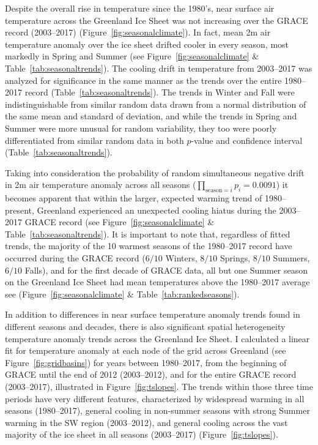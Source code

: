 \documentclass[11pt]{report}
\begin{document}
Despite the overall rise in temperature since the 1980's, near surface air temperature across the Greenland Ice Sheet was not increasing over the GRACE record (2003--2017) (Figure~\ref{fig:seasonalclimate}). In fact, mean 2m air temperature anomaly over the ice sheet drifted cooler in every season, most markedly in Spring and Summer (see Figure~\ref{fig:seasonalclimate} \& Table~\ref{tab:seasonaltrends}). The cooling drift in temperature from 2003--2017 was analyzed for significance in the same manner as the trends over the entire 1980--2017 record (Table~\ref{tab:seasonaltrends}). The trends in Winter and Fall were indistinguishable from similar random data drawn from a normal distribution of the same mean and standard of deviation, and while the trends in Spring and Summer were more unusual for random variability, they too were poorly differentiated from similar random data in both $p$-value and confidence interval (Table~\ref{tab:seasonaltrends}). 

Taking into consideration the probability of random simultaneous negative drift in 2m air temperature anomaly across all seasons ($\prod_{\mathrm{season}=i} p_i = 0.0091$) it becomes apparent that within the larger, expected warming trend of 1980--present, Greenland experienced an unexpected cooling hiatus during the 2003--2017 GRACE record (see Figure~\ref{fig:seasonalclimate} \& Table~\ref{tab:seasonaltrends}). It is important to note that, regardless of fitted trends, the majority of the 10 warmest seasons of the 1980--2017 record have occurred during the GRACE record ($6/10$ Winters, $8/10$ Springs, $8/10$ Summers, $6/10$ Falls), and for the first decade of GRACE data, all but one Summer season on the Greenland Ice Sheet had mean temperatures above the 1980--2017 average see (Figure~\ref{fig:seasonalclimate} \& Table~\ref{tab:rankedseasons}).

In addition to differences in near surface temperature anomaly trends found in different seasons and decades, there is also significant spatial heterogeneity temperature anomaly trends across the Greenland Ice Sheet. I calculated a linear fit for temperature anomaly at each node of the grid across Greenland (see Figure~\ref{fig:gridbasins}) for years between 1980--2017, from the beginning of GRACE until the end of 2012 (2003--2012), and for the entire GRACE record (2003--2017), illustrated in Figure~\ref{fig:tslopes}. The trends within those three time periods have very different features, characterized by widespread warming in all seasons (1980--2017), general cooling in non-summer seasons with strong Summer warming in the SW region (2003--2012), and general cooling across the vast majority of the ice sheet in all seasons (2003--2017) (Figure~\ref{fig:tslopes}). 
\end{document}
